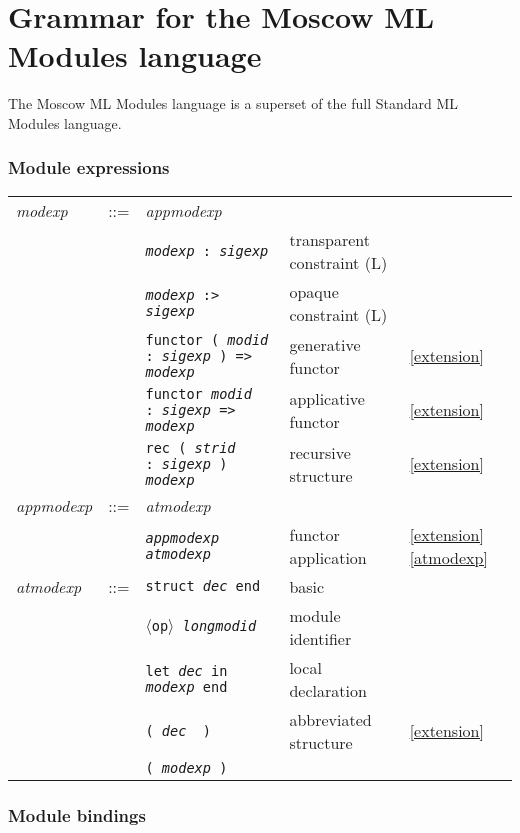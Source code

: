 \documentclass[fleqn,a4paper]{article}
\newcounter{extension}
\newcommand{\x}[1][]{\ref{extension}{#1}}
\newcommand{\la}{$\langle$}
\newcommand{\ra}{$\rangle$}
\newcommand{\opop}{\la{\tt op}\ra}
\begin{document}
\section{Grammar for the Moscow ML Modules language}
\label{sec-modules}

The Moscow ML Modules language is a superset of the full Standard ML Modules language.

\subsubsection*{Module expressions}

\begin{tabular}{@{}lllll}
{\it modexp\/} & ::= & {\it appmodexp\/}\\
& & {\tt {\it modexp\/} :\ {\it sigexp\/}} & transparent constraint (L)\\
& & {\tt {\it modexp\/} :> {\it sigexp\/}} & opaque constraint (L)\\
& & {\tt functor ( {\it modid\/} :\ {\it sigexp} ) => {\it modexp}}  & generative functor & \x \\
& & {\tt functor {\it modid\/} :\ {\it sigexp\/} => {\it modexp}}  & applicative functor & \x \\
& & {\tt rec ( {\it strid\/} :\ {\it sigexp} ) {\it modexp}}  & recursive structure& \x \\[2ex]

{\it appmodexp\/} & ::= & {\it atmodexp\/}\\
& & {\tt {\it appmodexp\/} {\it atmodexp\/}} & functor application&\x[\ref{atmodexp}] \\[2ex]

{\it atmodexp\/} & ::= & {\tt struct {\it dec\/} end} & basic\\
& & {\tt \opop\ {\it longmodid\/}}& module identifier\\
& & {\tt let {\it dec\/} in {\it modexp\/} end} & local declaration\\
& & {\tt ( {\it dec \/} )} & abbreviated structure & \x \\
& & {\tt ( {\it modexp\/} )} \\
\end{tabular}

\subsubsection*{Module bindings}
\end{document}
